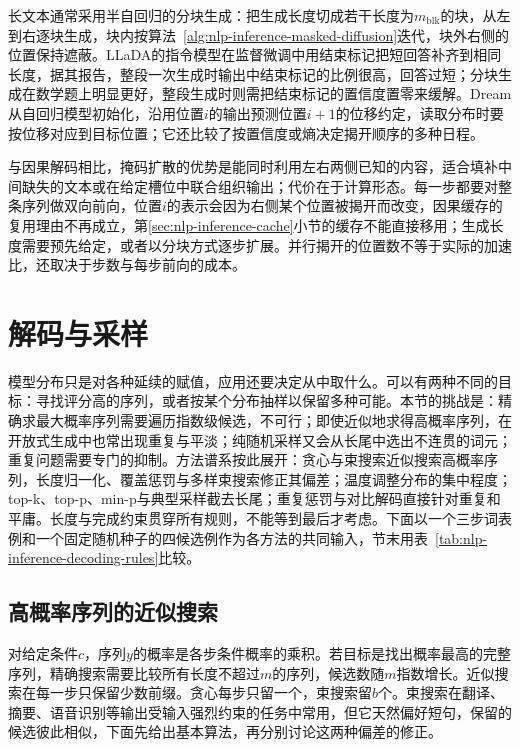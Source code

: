 长文本通常采用半自回归的分块生成：把生成长度切成若干长度为$m_{\mathrm{blk}}$的块，从左到右逐块生成，块内按算法~\ref{alg:nlp-inference-masked-diffusion}迭代，块外右侧的位置保持遮蔽。LLaDA的指令模型在监督微调中用结束标记把短回答补齐到相同长度，据其报告，整段一次生成时输出中结束标记的比例很高，回答过短；分块生成在数学题上明显更好，整段生成时则需把结束标记的置信度置零来缓解。Dream从自回归模型初始化，沿用位置$i$的输出预测位置$i+1$的位移约定，读取分布时要按位移对应到目标位置；它还比较了按置信度或熵决定揭开顺序的多种日程。

与因果解码相比，掩码扩散的优势是能同时利用左右两侧已知的内容，适合填补中间缺失的文本或在给定槽位中联合组织输出；代价在于计算形态。每一步都要对整条序列做双向前向，位置$i$的表示会因为右侧某个位置被揭开而改变，因果缓存的复用理由不再成立，第\ref{sec:nlp-inference-cache}小节的缓存不能直接移用；生成长度需要预先给定，或者以分块方式逐步扩展。并行揭开的位置数不等于实际的加速比，还取决于步数与每步前向的成本。

\section{解码与采样}
\label{sec:nlp-generation-candidates}

模型分布只是对各种延续的赋值，应用还要决定从中取什么。可以有两种不同的目标：寻找评分高的序列，或者按某个分布抽样以保留多种可能。本节的挑战是：精确求最大概率序列需要遍历指数级候选，不可行；即使近似地求得高概率序列，在开放式生成中也常出现重复与平淡；纯随机采样又会从长尾中选出不连贯的词元；重复问题需要专门的抑制。方法谱系按此展开：贪心与束搜索近似搜索高概率序列，长度归一化、覆盖惩罚与多样束搜索修正其偏差；温度调整分布的集中程度；top-k、top-p、min-p与典型采样截去长尾；重复惩罚与对比解码直接针对重复和平庸。长度与完成约束贯穿所有规则，不能等到最后才考虑。下面以一个三步词表例和一个固定随机种子的四候选例作为各方法的共同输入，节末用表~\ref{tab:nlp-inference-decoding-rules}比较。

\subsection{高概率序列的近似搜索}
\label{sec:nlp-generation-beam}

对给定条件$c$，序列$y$的概率是各步条件概率的乘积。若目标是找出概率最高的完整序列，精确搜索需要比较所有长度不超过$m$的序列，候选数随$m$指数增长。近似搜索在每一步只保留少数前缀。贪心每步只留一个，束搜索留$b$个。束搜索在翻译、摘要、语音识别等输出受输入强烈约束的任务中常用，但它天然偏好短句，保留的候选彼此相似，下面先给出基本算法，再分别讨论这两种偏差的修正。

